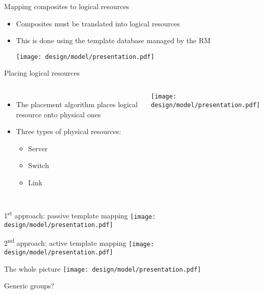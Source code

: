 \begin{frame}{Mapping composites to logical resources}
    \begin{itemize}
        \item Composites must be translated into logical resources
        \item This is done using the template database managed by the RM
        \begin{center}
            \texttt{[image: design/model/presentation.pdf]}
        \end{center}
    \end{itemize}
\end{frame}

\begin{frame}{Placing logical resources}
    \begin{columns}[T,onlytextwidth]
        \begin{itemize}
            \item The placement algorithm places logical resource onto physical ones
            \item Three types of physical resources:
            \begin{itemize}
                \item Server
                \item Switch
                \item Link
            \end{itemize}
        \end{itemize}
        \texttt{[image: design/model/presentation.pdf]}
    \end{columns}
\end{frame}

\begin{frame}{1\textsuperscript{st} approach: passive template mapping}
    \centering
    \texttt{[image: design/model/presentation.pdf]}
\end{frame}

\begin{frame}{2\textsuperscript{nd} approach: active template mapping}
    \centering
    \texttt{[image: design/model/presentation.pdf]}
\end{frame}

\begin{frame}{The whole picture}
    \centering
    \texttt{[image: design/model/presentation.pdf]}
\end{frame}

\begin{frame}{Generic groups?} %
\end{frame}
